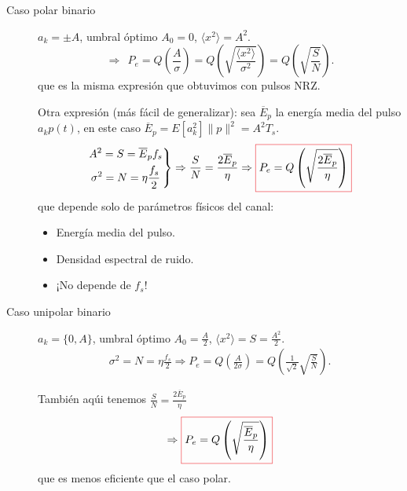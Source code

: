 \begin{enumerate}
    \begin{description}
        \item[Caso polar binario] $a_k=\pm A$, umbral óptimo
        $A_0=0$, $\langle x^2 \rangle = A^2$.
        \[ \Rightarrow \ \ P_e = Q\left(\frac{A}{\sigma}\right) = Q\left(\sqrt{\frac{\langle x^2 \rangle}{\sigma^2}}\right) = Q\left(\sqrt{\frac{S}{N}}\right).\]
        que es la misma expresión que obtuvimos con pulsos NRZ.

        Otra expresión (más fácil de generalizar): sea $\overline{E}_p$ la energía media del pulso $a_k
        p(t)$,
        en este caso $\overline{E}_p = E[a_k^2]\|p\|^2 = A^2 T_s$.
                \[\left.\begin{gathered}
                        A^2 = S = \overline{E}_p f_s\\
                        \sigma^2 = N = \eta \frac{f_s}{2}
                      \end{gathered}\right\}\Rightarrow \frac{S}{N} = \frac{2\overline{E}_p}{\eta}\Rightarrow \col{P_e = Q\left(\sqrt{\frac{2\overline{E}_p}{\eta}}\right)}\]
        que depende solo de parámetros físicos del canal:
        \begin{itemize}
            \item Energía media del pulso.
            \item Densidad espectral de ruido.
            \item ¡No depende de $f_s$!
        \end{itemize}
        \vspace{1ex}

        \item[Caso unipolar binario] $a_k = \{0,A\}$, umbral óptimo
        $A_0=\frac{A}{2}$, $\langle x^2 \rangle = S = \frac{A^2}{2}$.
        \begin{align*}
         \sigma^2 = N = \eta \frac{f_s}{2} \Longrightarrow   P_e = Q\left(\frac{A}{2\sigma}\right) =
         Q\left(\frac{1}{\sqrt{2}}\sqrt{\frac{S}{N}}\right).
        \end{align*}

        También aqúi tenemos $\frac{S}{N} = \frac{2\overline{E}_p}{\eta}$
        \[\Rightarrow \col{P_e = Q\left(\sqrt{\frac{\overline{E}_p}{\eta}}\right)}\]
        que es menos eficiente que el caso polar.
    \end{description}


\end{enumerate}
